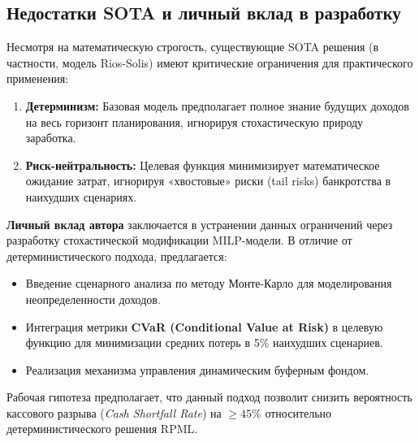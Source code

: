 \documentclass[12pt, a4paper]{report}
\begin{document}
\subsection{Недостатки SOTA и личный вклад в разработку}

Несмотря на математическую строгость, существующие SOTA решения (в частности, модель Rios-Solis) имеют критические ограничения для практического применения:
\begin{enumerate}
    \item \textbf{Детерминизм:} Базовая модель предполагает полное знание будущих доходов на весь горизонт планирования, игнорируя стохастическую природу заработка.
    \item \textbf{Риск-нейтральность:} Целевая функция минимизирует математическое ожидание затрат, игнорируя «хвостовые» риски (tail risks) банкротства в наихудших сценариях.
\end{enumerate}

\textbf{Личный вклад автора} заключается в устранении данных ограничений через разработку стохастической модификации MILP-модели. В отличие от детерминистического подхода, предлагается:
\begin{itemize}
    \item Введение сценарного анализа по методу Монте-Карло для моделирования неопределенности доходов.
    \item Интеграция метрики \textbf{CVaR (Conditional Value at Risk)} в целевую функцию для минимизации средних потерь в 5\% наихудших сценариев.
    \item Реализация механизма управления динамическим буферным фондом.
\end{itemize}

Рабочая гипотеза предполагает, что данный подход позволит снизить вероятность кассового разрыва (\textit{Cash Shortfall Rate}) на $\ge 45\%$ относительно детерминистического решения RPML.

\newpage

\printbibliography[title={Список литературы}]
\end{document}

